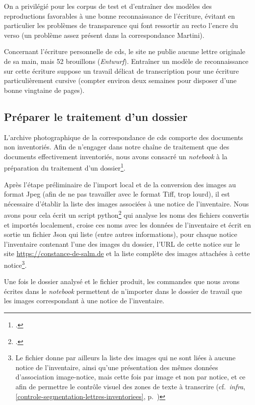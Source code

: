 \documentclass[a4paper,12pt,twoside]{book}
\begin{document}
				On a privilégié pour les corpus de test et d'entraîner des modèles des reproductions favorables à une bonne reconnaissance de l'écriture, évitant en particulier les problèmes de transparence qui font ressortir au recto l'encre du verso (un problème assez présent dans la correspondance Martini).
				
				Concernant l'écriture personnelle de \gls{cds}, le site ne publie aucune lettre originale de sa main, mais 52 brouillons (\textit{Entwurf}). Entraîner un modèle de reconnaissance sur cette écriture suppose un travail délicat de transcription pour une écriture particulièrement cursive (compter environ deux semaines pour disposer d'une bonne vingtaine de pages).
		
			\subsection{Préparer le traitement d'un dossier}
				L'archive photographique de la correspondance de \gls{cds} comporte des documents non inventoriés. Afin de n'engager dans notre chaîne de traitement que des documents effectivement inventoriés, nous avons consacré un \textit{notebook} à la préparation du traitement d'un dossier\footcite{biayPreparerTraitementDossier2022}.
				
				Après l'étape préliminaire de l'import local et de la conversion des images au format Jpeg (afin de ne pas travailler avec le format Tiff, trop lourd), il est nécessaire d'établir la liste des images associées à une notice de l'inventaire. Nous avons pour cela écrit un script python\footcite{biayDonneesImagesPy2022} qui analyse les noms des fichiers convertis et importés localement, croise ces noms avec les données de l'inventaire et écrit en sortie un fichier Json qui liste (entre autres informations), pour chaque notice l'inventaire contenant l'une des images du dossier, l'URL de cette notice sur le site \url{https://constance-de-salm.de} et la liste complète des images attachées à cette notice\footnote{Le fichier donne par ailleurs la liste des images qui ne sont liées à aucune notice de l'inventaire, ainsi qu'une présentation des mêmes données d'association image-notice, mais cette fois par image et non par notice, et ce afin de permettre le contrôle visuel des zones de texte à transcrire (cf.~\textit{infra}, \ref{controle-segmentation-lettres-inventoriees}, p.~\pageref{controle-segmentation-lettres-inventoriees})}.
				
				Une fois le dossier analysé et le fichier produit, les commandes que nous avons écrites dans le \textit{notebook} permettent de n'importer dans le dossier de travail que les images correspondant à une notice de l'inventaire.
			
\end{document}
